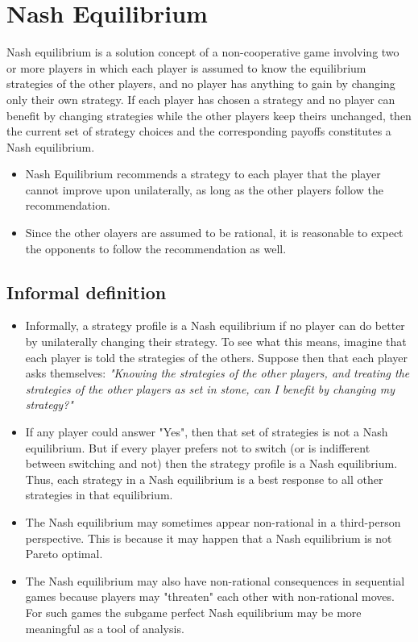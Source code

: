 \documentclass[a4paper,12pt]{article}
\begin{document}
\section{Nash Equilibrium}
Nash equilibrium is a solution concept of a non-cooperative game involving two or more players in which each player is assumed to know the equilibrium strategies of the other players, and no player has anything to gain by changing only their own strategy.
If each player has chosen a strategy and no player can benefit by changing strategies while the other players keep theirs unchanged, then the current set of strategy choices and the corresponding payoffs constitutes a Nash equilibrium. 

\begin{framed}
\begin{itemize}
\item Nash Equilibrium recommends a strategy to each player that the player cannot improve upon unilaterally, as long as the other players follow the recommendation.
\item Since the other olayers are assumed to be rational, it is reasonable to expect the opponents to follow the recommendation as well.
\end{itemize}
\end{framed}


\subsection{Informal definition}
\begin{itemize}
\item Informally, a strategy profile is a Nash equilibrium if no player can do better by unilaterally changing their strategy. To see what this means, imagine that each player is told the strategies of the others. Suppose then that each player asks themselves: \textit{"Knowing the strategies of the other players, and treating the strategies of the other players as set in stone, can I benefit by changing my strategy?"}
\item If any player could answer "Yes", then that set of strategies is not a Nash equilibrium. But if every player prefers not to switch (or is indifferent between switching and not) then the strategy profile is a Nash equilibrium. Thus, each strategy in a Nash equilibrium is a best response to all other strategies in that equilibrium.
\item The Nash equilibrium may sometimes appear non-rational in a third-person perspective. This is because it may happen that a Nash equilibrium is not Pareto optimal.
\item The Nash equilibrium may also have non-rational consequences in sequential games because players may "threaten" each other with non-rational moves. For such games the subgame perfect Nash equilibrium may be more meaningful as a tool of analysis.
\end{itemize}
\newpage
\end{document}
